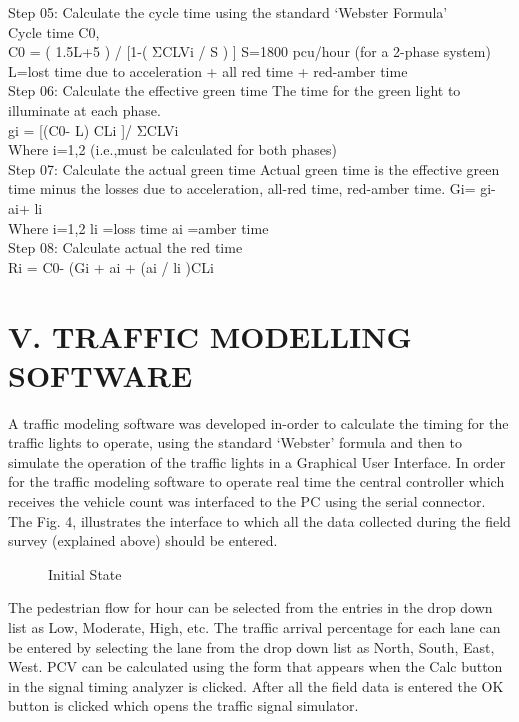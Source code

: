 \documentclass{SureshLimkar}
\begin{document}
\hspace Step 05: Calculate the cycle time using the standard ‘Webster Formula’\\ 
 Cycle time C0,\\
\hspace C0 = ( 1.5L+5 ) / [1-( ΣCLVi / S ) ]  
S=1800 pcu/hour (for a 2-phase system)\\
\hspace L=lost time due to acceleration + all red time + red-amber time\\
\hspace Step 06: Calculate the effective green time The time for the green light to illuminate at each phase.\\
\hspace gi = [(C0- L) CLi ]/ ΣCLVi\\ 
\hspace Where i=1,2 (i.e.,must be calculated for both phases) \\
\hspace Step 07: Calculate the actual green time 
Actual green time is the effective green time minus the losses due to acceleration, all-red time, red-amber time. Gi= gi- ai+ li\\
\hspace Where i=1,2 li =loss time ai =amber time\\ 
\hspace Step 08: Calculate actual the red time\\
Ri = C0- (Gi + ai + (ai / li )CLi         
\\

\chapter{V. TRAFFIC MODELLING SOFTWARE}

\hspace{0.5 in}A traffic modeling software was developed in-order to calculate the timing for the traffic lights to operate, using the standard ‘Webster’ formula and then to simulate the operation of the traffic lights in a Graphical User Interface.  In order for the traffic modeling software to operate real time the central controller which receives the vehicle count was interfaced to the PC using the serial connector.  The Fig. 4, illustrates the interface to which all the data collected during the field survey (explained above) should be entered.

\begin{figure}%
\centering
{}%
\caption{Initial State}%
\label{Traffic Light State Diagram}%
\end{figure}



\hspace{0.5 in}The pedestrian flow for hour can be selected from the entries in the drop down list as Low, Moderate, High, etc.  The traffic arrival percentage for each lane can be entered by selecting the lane from the drop down list as North, South, East, West.  PCV can be calculated using the form that appears when the Calc button in the signal timing analyzer is clicked.  After all the field data is entered the OK button is clicked which opens the traffic signal simulator.
\end{document}
